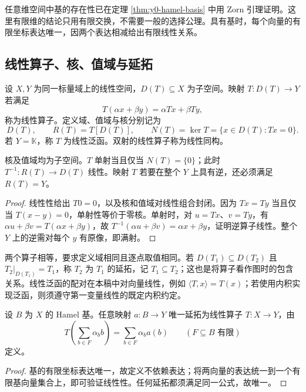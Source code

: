 任意维空间中基的存在性已在定理 \ref{thm:y0-hamel-basis} 中用 Zorn 引理证明。这里有限维的结论只用有限交换，不需要一般的选择公理。具有基时，每个向量的有限坐标表达唯一，因两个表达相减给出有限线性关系。

\subsection{线性算子、核、值域与延拓}
\begin{definition}[线性算子与线性泛函]\label{def:y0-linear-operator}
设 $X,Y$ 为同一标量域上的线性空间，$D(T)\subseteq X$ 为子空间。映射 $T:D(T)\to Y$ 若满足
\[
 T(\alpha x+\beta y)=\alpha Tx+\beta Ty,
\]
称为线性算子。定义域、值域与核分别记为
\[
 D(T),\qquad R(T)=T[D(T)],\qquad N(T)=\ker T=\{x\in D(T):Tx=0\}.
\]
若 $Y=\mathbb K$，称 $T$ 为线性泛函。双射的线性算子称为线性同构。
\end{definition}

\begin{proposition}[核、值域与逆算子]\label{prop:y0-operator}
核及值域均为子空间。$T$ 单射当且仅当 $N(T)=\{0\}$；此时 $T^{-1}:R(T)\to D(T)$ 线性。映射 $T$ 若要在整个 $Y$ 上具有逆，还必须满足 $R(T)=Y$。
\end{proposition}
\begin{proof}
线性性给出 $T0=0$，以及核和值域对线性组合封闭。因为 $Tx=Ty$ 当且仅当 $T(x-y)=0$，单射性等价于零核。单射时，对 $u=Tx$、$v=Ty$，有 $\alpha u+\beta v=T(\alpha x+\beta y)$，故 $T^{-1}(\alpha u+\beta v)=\alpha x+\beta y$，证明逆算子线性。整个 $Y$ 上的逆需对每个 $y$ 有原像，即满射。
\end{proof}

两个算子相等，要求定义域相同且逐点取值相同。若 $D(T_1)\subseteq D(T_2)$ 且 $T_2|_{D(T_1)}=T_1$，称 $T_2$ 为 $T_1$ 的延拓，记 $T_1\subseteq T_2$；这也是将算子看作图时的包含关系。线性泛函的配对在本稿中对向量线性，例如 $\langle T,x\rangle=T(x)$；若使用内积实现泛函，则须遵守第一变量线性的既定内积约定。

\begin{proposition}[由基上的取值定义算子]\label{prop:y0-basis-map}
设 $B$ 为 $X$ 的 Hamel 基。任意映射 $a:B\to Y$ 唯一延拓为线性算子 $T:X\to Y$，由
\[
 T\left(\sum_{b\in F}\alpha_bb\right)
          =\sum_{b\in F}\alpha_ba(b)
 \qquad(F\subseteq B\text{ 有限})
\]
定义。
\end{proposition}
\begin{proof}
基的有限坐标表达唯一，故定义不依赖表达；将两向量的表达统一到一个有限基向量集合上，即可验证线性性。任何延拓都须满足同一公式，故唯一。
\end{proof}

